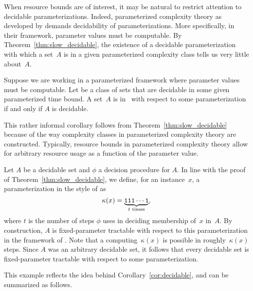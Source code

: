 When resource bounds are of interest, it may be natural to restrict attention to decidable parameterizations.
Indeed, parameterized complexity theory as developed by \textcite{flum2006parameterized} demands decidability of parameterizations.
More specifically, in their framework, parameter values must be computable.
By Theorem~\ref{thm:slow_decidable}, the existence of a decidable parameterization with which a set~$A$ is in a given parameterized complexity class tells us very little about~$A$.
\begin{corollary}
\label{cor:decidable}%
  Suppose we are working in a parameterized framework where parameter values must be computable.
  Let  be a class of sets that are decidable in some given parameterized time bound.
  A set~$A$ is in~ with respect to some parameterization if and only if $A$ is decidable.
\end{corollary}

This rather informal corollary follows from Theorem~\ref{thm:slow_decidable} because of the way complexity classes in parameterized complexity theory are constructed.
Typically, resource bounds in parameterized complexity theory allow for arbitrary resource usage as a function of the parameter value.

\begin{example}
  Let $A$ be a decidable set and $\phi$ a decision procedure for $A$.
  In line with the proof of Theorem~\ref{thm:slow_decidable}, we define, for an instance~$x$, a parameterization in the style of \citeauthor{flum2006parameterized} as
  \begin{equation*}
    \kappa(x) = \underbrace{\textnormal{\texttt{111}}\cdots\textnormal{\texttt{1}}}_{\text{$t$ times}},
  \end{equation*}
  where $t$ is the number of steps $\phi$ uses in deciding membership of~$x$ in~$A$.
  By construction, $A$ is fixed-parameter tractable with respect to this parameterization in the framework of \citeauthor{flum2006parameterized}.
  Note that a computing~$\kappa(x)$ is possible in roughly~$\kappa(x)$ steps.
  Since $A$ was an arbitrary decidable set, it follows that every decidable set is fixed-parameter tractable with respect to some parameterization.
\end{example}

This example reflects the idea behind Corollary~\ref{cor:decidable}, and can be summarized as follows.
\slogan[\label{slo:decidable}]{When parameter values must be computable, a set can be fixed-parameter tractable precisely if it is decidable.}

